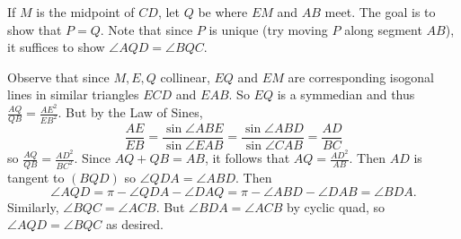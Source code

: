 If $M$ is the midpoint of $CD$, let $Q$ be where $EM$ and $AB$ meet. The goal is to show that $P=Q$. Note that since $P$ is unique (try moving $P$ along segment $AB$), it suffices to show $\angle{AQD}=\angle{BQC}$.

Observe that since $M,E,Q$ collinear, $EQ$ and $EM$ are corresponding isogonal lines in similar triangles $ECD$ and $EAB$. So $EQ$ is a symmedian and thus $\frac{AQ}{QB}=\frac{AE^2}{EB^2}$. But by the Law of Sines, \[\frac{AE}{EB}=\frac{\sin\angle{ABE}}{\sin\angle{EAB}}=\frac{\sin\angle{ABD}}{\sin\angle{CAB}}=\frac{AD}{BC}\] so $\frac{AQ}{QB}=\frac{AD^2}{BC^2}$. Since $AQ+QB=AB$, it follows that $AQ=\frac{AD^2}{AB}$. Then $AD$ is tangent to $(BQD)$ so $\angle{QDA}=\angle{ABD}$. Then \[\angle{AQD}=\pi-\angle{QDA}-\angle{DAQ}=\pi-\angle{ABD}-\angle{DAB}=\angle{BDA}.\] Similarly, $\angle{BQC}=\angle{ACB}$. But $\angle{BDA}=\angle{ACB}$ by cyclic quad, so $\angle{AQD}=\angle{BQC}$ as desired.